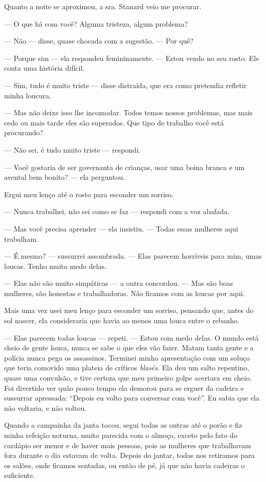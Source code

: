 Quanto a noite se aproximou, a sra. Stanard veio me procurar.

--- O que há com você? Alguma tristeza, algum problema?

--- Não --- disse, quase chocada com a sugestão. --- Por quê?

--- Porque sim --- ela respondeu femininamente. --- Estou vendo no seu
rosto. Ele conta uma história difícil.

--- Sim, tudo é muito triste --- disse distraída, que era como pretendia
refletir minha loucura.

--- Mas não deixe isso lhe incomodar. Todos temos nossos problemas, mas
mais cedo ou mais tarde eles são superados. Que tipo de trabalho você
está procurando?

--- Não sei, é tudo muito triste --- respondi.

--- Você gostaria de ser governanta de crianças, usar uma boina branca e
um avental bem bonito? --- ela perguntou.

Ergui meu lenço até o rosto para esconder um sorriso. 

--- Nunca
trabalhei, não sei como se faz --- respondi com a voz abafada.

--- Mas você precisa aprender --- ela insistiu. --- Todas essas mulheres
aqui trabalham.

--- É mesmo? --- sussurrei assombrada. --- Elas parecem horríveis para
mim, umas loucas. Tenho muito medo delas.

--- Elas não são muito simpáticas --- a outra concordou. --- Mas são
boas mulheres, são honestas e trabalhadoras. Não ficamos com as loucas
por aqui.

Mais uma vez usei meu lenço para esconder um sorriso, pensando que, antes
do sol nascer, ela consideraria que havia ao menos uma louca entre o
rebanho.

--- Elas parecem todas loucas --- repeti. --- Estou com medo delas. O
mundo está cheio de gente louca, nunca se sabe o que eles vão fazer.
Matam tanta gente e a polícia nunca pega os assassinos. Terminei minha
apresentação com um soluço que teria comovido uma plateia de críticos
\emph{blasés}. Ela deu um salto repentino, quase uma convulsão, e tive certeza
que meu primeiro golpe acertara em cheio. Foi divertido ver quão pouco
tempo ela demorou para se erguer da cadeira e sussurrar apressada: 
``Depois eu volto para conversar com você''. Eu sabia que ela não
voltaria, e não voltou.

Quando a campainha da janta tocou, segui todas as outras até o porão e
fiz minha refeição noturna, muito parecida com o almoço, exceto pelo
fato do cardápio ser menor e de haver mais pessoas, pois as mulheres que
trabalhavam fora durante o dia estavam de volta. Depois do jantar, todas
nos retiramos para os salões, onde ficamos sentadas, ou então de pé, já
que não havia cadeiras o suficiente.

